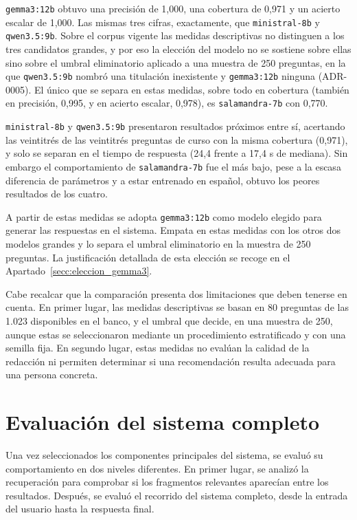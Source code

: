 \texttt{gemma3:12b} obtuvo una precisión de 1,000, una cobertura de 0,971 y un acierto escalar de 1,000. Las mismas tres cifras, exactamente, que \texttt{ministral-8b} y \texttt{qwen3.5:9b}. Sobre el corpus vigente las medidas descriptivas no distinguen a los tres candidatos grandes, y por eso la elección del modelo no se sostiene sobre ellas sino sobre el umbral eliminatorio aplicado a una muestra de 250 preguntas, en la que \texttt{qwen3.5:9b} nombró una titulación inexistente y \texttt{gemma3:12b} ninguna (ADR-0005). El único que se separa en estas medidas, sobre todo en cobertura (también en precisión, 0,995, y en acierto escalar, 0,978), es \texttt{salamandra-7b} con 0,770.

\texttt{ministral-8b} y \texttt{qwen3.5:9b} presentaron resultados próximos entre sí, acertando las veintitrés de las veintitrés preguntas de curso con la misma cobertura (0,971), y solo se separan en el tiempo de respuesta (24,4 frente a 17,4 s de mediana). Sin embargo el comportamiento de \texttt{salamandra-7b} fue el más bajo, pese a la escasa diferencia de parámetros y a estar entrenado en español, obtuvo los peores resultados de los cuatro.

A partir de estas medidas se adopta \texttt{gemma3:12b} como modelo elegido para generar las respuestas en el sistema. Empata en estas medidas con los otros dos modelos grandes y lo separa el umbral eliminatorio en la muestra de 250 preguntas. La justificación detallada de esta elección se recoge en el Apartado~\ref{secc:eleccion_gemma3}.

Cabe recalcar que la comparación presenta dos limitaciones que deben tenerse en cuenta. En primer lugar, las medidas descriptivas se basan en 80 preguntas de las 1.023 disponibles en el banco, y el umbral que decide, en una muestra de 250, aunque estas se seleccionaron mediante un procedimiento estratificado y con una semilla fija. En segundo lugar, estas medidas no evalúan la calidad de la redacción ni permiten determinar si una recomendación resulta adecuada para una persona concreta.

\section[Evaluación del sistema completo]{Evaluación del sistema completo}
\label{secc:resultados_sistema}

Una vez seleccionados los componentes principales del sistema, se evaluó su comportamiento en dos niveles diferentes. En primer lugar, se analizó la recuperación para comprobar si los fragmentos relevantes aparecían entre los resultados. Después, se evaluó el recorrido del sistema completo, desde la entrada del usuario hasta la respuesta final.


